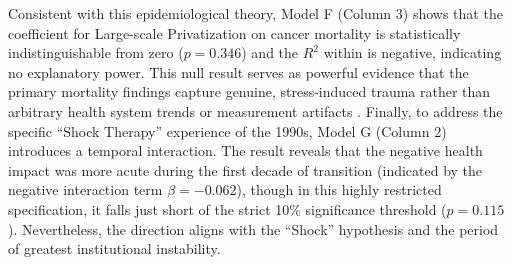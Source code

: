\documentclass[12pt]{article}
\begin{document}
Consistent with this epidemiological theory, Model F (Column 3) shows that the coefficient for Large-scale Privatization on cancer mortality is statistically indistinguishable from zero ($p = 0.346$) and 
the $R^2$ within is negative, indicating no explanatory power. This null result serves as powerful evidence that the primary mortality findings capture genuine, stress-induced trauma rather than arbitrary 
health system trends or measurement artifacts \citep{Azarova2018, Leon1997}. Finally, to address the specific ``Shock Therapy'' experience of the 1990s, Model G (Column 2) introduces a temporal interaction. 
The result reveals that the negative health impact was more acute during the first decade of transition (indicated by the negative interaction term $\beta = -0.062$), though in this highly restricted 
specification, it falls just short of the strict 10\% significance threshold ($p = 0.115$). Nevertheless, the direction aligns with the ``Shock'' hypothesis and the period of greatest institutional instability.
\end{document}
